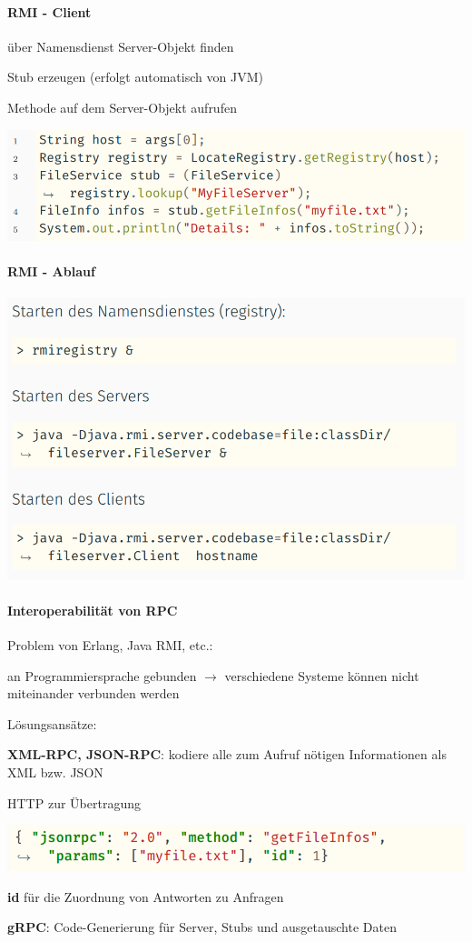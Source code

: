 \documentclass[10pt]{article}
\begin{document}
\paragraph{RMI - Client}

\begin{itemize*}
  \item über Namensdienst Server-Objekt finden
  \item Stub erzeugen (erfolgt automatisch von JVM)
  \item Methode auf dem Server-Objekt aufrufen
\end{itemize*}
\begin{center}
  \includegraphics[width=0.4\linewidth]{Assets/Programmierparadigmen-code-snippet-81}
\end{center}

\paragraph{RMI - Ablauf}

\begin{center}
  \includegraphics[width=0.4\linewidth]{Assets/Programmierparadigmen-code-snippet-82}
\end{center}

\paragraph{Interoperabilität von RPC}

Problem von Erlang, Java RMI, etc.: 
\begin{itemize*}
  \item an Programmiersprache gebunden $\rightarrow$ verschiedene Systeme können nicht miteinander verbunden werden
\end{itemize*}
Lösungsansätze: 
\begin{itemize*}
  \item \textbf{XML-RPC, JSON-RPC}: kodiere alle zum Aufruf nötigen Informationen als XML bzw. JSON
  \begin{itemize*}
    \item HTTP zur Übertragung
    \item \includegraphics[width=0.4\linewidth]{Assets/Programmierparadigmen-code-snippet-83}
    \item \textbf{id} für die Zuordnung von Antworten zu Anfragen
  \end{itemize*}
  \item \textbf{gRPC}: Code-Generierung für Server, Stubs und ausgetauschte Daten
\end{itemize*}
\end{document}
